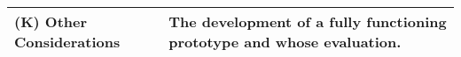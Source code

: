 \documentclass[10pt,table]{article}
\providecommand{\lgc}{\cellcolor{lightgray}}
\begin{document}
\begin{center}
\begin{longtable}{p{4.5cm}p{4cm}p{2.5cm}p{4cm}p{2.5cm}p{3.5cm}}
		\lgc (K) Other Considerations    & \multicolumn{5}{p{18cm}}{The development of a fully functioning prototype and whose evaluation.}                                                                                                                                                                                                                                                                                                                                                                                                                                \\[1ex]
		\bottomrule
	\end{longtable}
\end{center}




\end{document}
